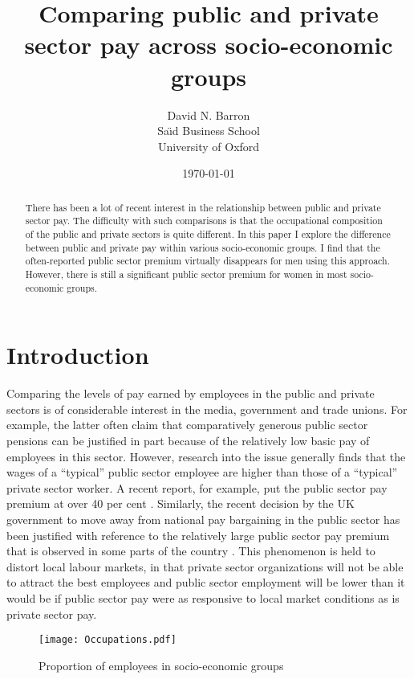\documentclass[a4paper,11pt,titlepage]{article}
\title{Comparing public and private sector pay across socio-economic groups}
\author{David N. Barron\\ Sa\"{\i}d Business School\\ University of Oxford}
\date{\today}
\let\cite\citep
\begin{document}
\maketitle

\thispagestyle{fancy}

\begin{abstract}
    There has been a lot of recent interest in the relationship between public and private sector pay.  The difficulty with such comparisons is that the occupational composition of the public and private sectors is quite different.  In this paper I explore the difference between public and private pay within various socio-economic groups. I find that the often-reported public sector premium virtually disappears for men using this approach.  However, there is still a significant public sector premium for women in most socio-economic groups.
\end{abstract}

\section{Introduction}
Comparing the levels of pay earned by employees in the public and private sectors is of considerable interest in the media, government and trade unions.  For example, the latter often claim that comparatively generous public sector pensions can be justified in part because of the relatively low basic pay of employees in this sector.  However, research into the issue generally finds that the wages of a ``typical'' public sector employee are higher than those of a ``typical'' private sector worker.  A recent report, for example, put the public sector pay premium at over 40 per cent \citep{Holmes2011}.  Similarly, the recent decision by the UK government to move away from national pay bargaining in the public sector has been justified with reference to the relatively large public sector pay premium that is observed in some parts of the country \cite{OME2012} . This phenomenon is held to distort local labour markets, in that private sector organizations will not be able to attract the best employees and public sector employment will be lower than it would be if public sector pay were as responsive to local market conditions as is private sector pay.

\begin{figure}[htb]
    \centering
    \texttt{[image: Occupations.pdf]}
    \caption{Proportion of employees in socio-economic groups\label{fig:segs}}
\end{figure}
\end{document}

